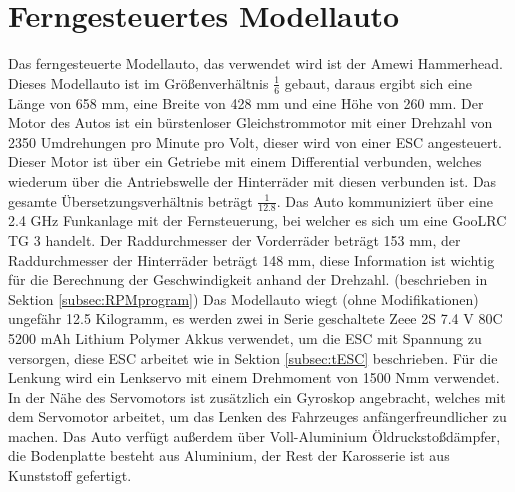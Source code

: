 \section{Ferngesteuertes Modellauto}
\label{sec:Auto}
Das ferngesteuerte Modellauto, das verwendet wird ist der Amewi Hammerhead. Dieses Modellauto ist im Größenverhältnis $\frac{1}{6}$ gebaut, daraus ergibt sich eine Länge von 658 \ac{mm}, eine Breite von 428 \ac{mm} und eine Höhe von 260 \ac{mm}. Der Motor des Autos ist ein bürstenloser Gleichstrommotor mit einer Drehzahl von 2350 Umdrehungen pro Minute pro Volt, dieser wird von einer \ac{ESC} angesteuert. Dieser Motor ist über ein Getriebe mit einem Differential verbunden, welches wiederum über die Antriebswelle der Hinterräder mit diesen verbunden ist. Das gesamte Übersetzungsverhältnis beträgt $\frac{1}{12.8}$. Das Auto kommuniziert über eine 2.4 \ac{GHz} Funkanlage mit der Fernsteuerung, bei welcher es sich um eine GooLRC TG 3 handelt. Der Raddurchmesser der Vorderräder beträgt 153 \ac{mm}, der Raddurchmesser der Hinterräder beträgt 148 \ac{mm}, diese Information ist wichtig für die Berechnung der Geschwindigkeit anhand der Drehzahl. (beschrieben in Sektion \ref{subsec:RPMprogram}) Das Modellauto wiegt (ohne Modifikationen) ungefähr 12.5 Kilogramm, es werden zwei in Serie geschaltete Zeee 2S 7.4 \ac{V} 80C 5200 \ac{mAh} Lithium Polymer Akkus verwendet, um die \ac{ESC} mit Spannung zu versorgen, diese \ac{ESC} arbeitet wie in Sektion \ref{subsec:tESC} beschrieben. Für die Lenkung wird ein Lenkservo mit einem Drehmoment von 1500 \ac{Nmm} verwendet. In der Nähe des Servomotors ist zusätzlich ein Gyroskop angebracht, welches mit dem Servomotor arbeitet, um das Lenken des Fahrzeuges anfängerfreundlicher zu machen. Das Auto verfügt außerdem über Voll-Aluminium Öldruckstoßdämpfer, die Bodenplatte besteht aus Aluminium, der Rest der Karosserie ist aus Kunststoff gefertigt.